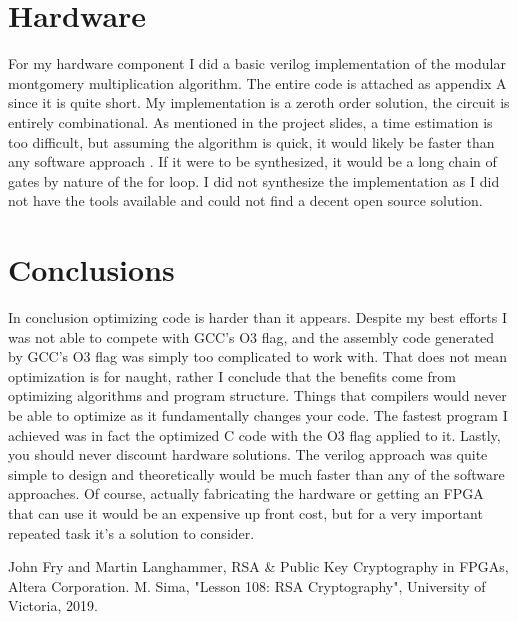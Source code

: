 \documentclass[12pt]{article}
\begin{document}
\clearpage

\section{Hardware}

For my hardware component I did a basic verilog implementation of the modular montgomery multiplication algorithm. The entire code is attached as appendix A since it is quite short. My implementation is a zeroth order solution, the circuit is entirely combinational. As mentioned in the project slides, a time estimation is too difficult, but assuming the algorithm is quick, it would likely be faster than any software approach \cite{RSA}. If it were to be synthesized, it would be a long chain of gates by nature of the for loop. I did not synthesize the implementation as I did not have the tools available and could not find a decent open source solution. 

\section{Conclusions}

In conclusion optimizing code is harder than it appears. Despite my best efforts I was not able to compete with GCC's O3 flag, and the assembly code generated by GCC's O3 flag was simply too complicated to work with. That does not mean optimization is for naught, rather I conclude that the benefits come from optimizing algorithms and program structure. Things that compilers would never be able to optimize as it fundamentally changes your code. The fastest program I achieved was in fact the optimized C code with the O3 flag applied to it. Lastly, you should never discount hardware solutions. The verilog approach was quite simple to design and theoretically would be much faster than any of the software approaches. Of course, actually fabricating the hardware or getting an FPGA that can use it would be an expensive up front cost, but for a very important repeated task it's a solution to consider. 

\begin{thebibliography}{2}
 John Fry and Martin Langhammer, RSA \& Public Key Cryptography in
FPGAs, Altera Corporation.
 M. Sima, "Lesson 108: RSA Cryptography", University of Victoria, 2019.

\end{thebibliography}

\clearpage
\end{document}
